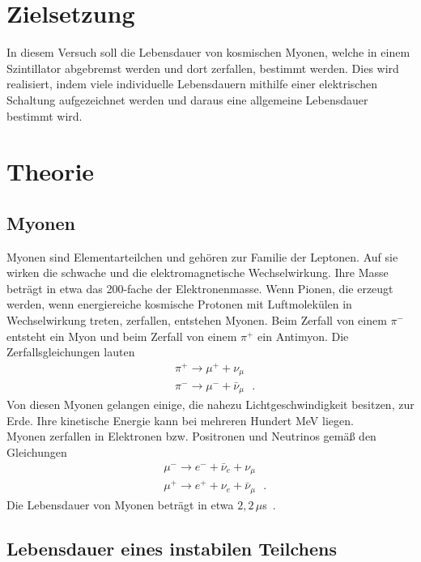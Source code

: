 
  \section{Zielsetzung}

    In diesem Versuch soll die Lebensdauer von kosmischen Myonen,
    welche in einem Szintillator abgebremst werden und dort zerfallen,
    bestimmt werden. Dies wird realisiert, indem viele individuelle Lebensdauern
    mithilfe einer elektrischen Schaltung
    aufgezeichnet werden und daraus eine allgemeine Lebensdauer bestimmt wird.


  \section{Theorie}

    \subsection{Myonen}

    Myonen sind Elementarteilchen und gehören zur Familie der Leptonen.
    Auf sie wirken die schwache und die elektromagnetische Wechselwirkung.
    Ihre Masse beträgt in etwa das 200-fache der Elektronenmasse.
    Wenn Pionen, die erzeugt werden, wenn energiereiche kosmische Protonen
    mit Luftmolekülen in Wechselwirkung treten, zerfallen, entstehen Myonen.
    Beim Zerfall von einem $\pi^-$ entsteht ein Myon und beim Zerfall von
    einem $\pi^+$ ein Antimyon. Die Zerfallsgleichungen lauten
    \begin{align*}
      &\pi^+ \to \mu^+ +\nu_{\mu}\\
      &\pi^- \to \mu^- +\bar{\nu}_{\mu}\,\,\,\,.
    \end{align*}
    Von diesen Myonen gelangen einige, die nahezu Lichtgeschwindigkeit
    besitzen, zur Erde. Ihre kinetische Energie kann bei mehreren Hundert MeV
    liegen. \\
    Myonen zerfallen in Elektronen bzw. Positronen und Neutrinos gemäß den Gleichungen
    \begin{align*}
      &\mu^- \to e^- +\bar{\nu}_e+\nu_{\mu}\\
      &\mu^+ \to e^+ +\nu_e +\bar{\nu}_{\mu}\,\,\,\,.
    \end{align*}
    Die Lebensdauer von Myonen beträgt in etwa $2,2\,\mu$s~\cite{pdg}.

    \subsection{Lebensdauer eines instabilen Teilchens}

